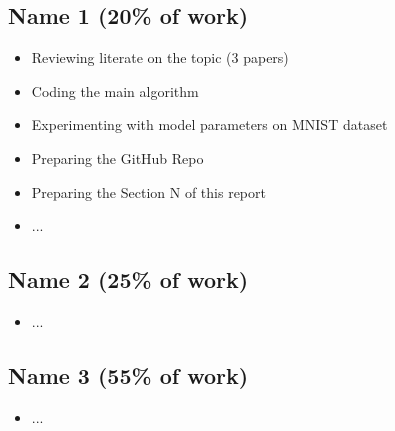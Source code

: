 \documentclass{article}
\begin{document}
\subsection*{Name 1 (20\% of work)}
\begin{itemize}
    \item Reviewing literate on the topic (3 papers)
    \item Coding the main algorithm
    \item Experimenting with model parameters on MNIST dataset
    \item Preparing the GitHub Repo
    \item Preparing the Section N of this report
    \item ...
\end{itemize}

\subsection*{Name 2 (25\% of work)}
\begin{itemize}
    \item ...
\end{itemize}

\subsection*{Name 3 (55\% of work)}
\begin{itemize}
    \item ...
\end{itemize}

\clearpage
\end{document}

